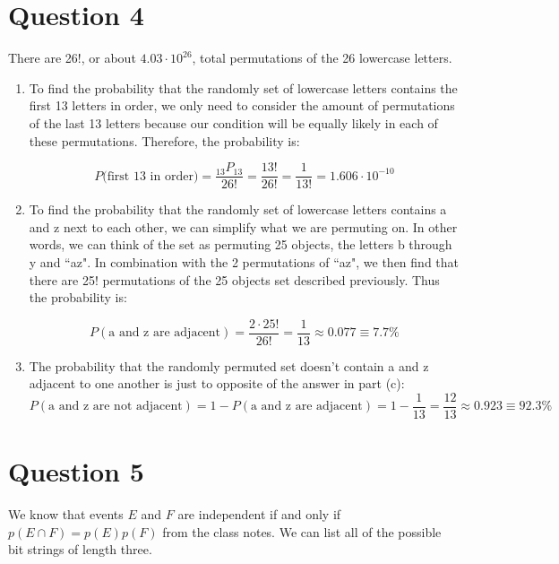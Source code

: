 \documentclass[11pt]{article}
\begin{document}
\section*{Question 4}
There are 26!, or about $4.03 \cdot 10^{26}$, total permutations of the 26 lowercase letters.

\begin{enumerate}
    \item To find the probability that the randomly set of lowercase letters contains the first 13 letters in order, we only need to consider the amount of permutations of the last 13 letters because our condition will be equally likely in each of these permutations. Therefore, the probability is:
    
    \[P(\text{first 13 in order)} = \frac{_{13}P_{13}}{26!} = \frac{13!}{26!} = \frac{1}{13!} = 1.606 \cdot 10^{-10}\]
    
    \item To find the probability that the randomly set of lowercase letters contains a and z next to each other, we can simplify what we are permuting on. In other words, we can think of the set as permuting 25 objects, the letters b through y and ``az". In combination with the 2 permutations of ``az", we then find that there are 25! permutations of the 25 objects set described previously. Thus the probability is:
    
    \[P(\text{a and z are adjacent}) = \frac{2 \cdot 25!}{26!} = \frac{1}{13} \approx 0.077 \equiv 7.7\%\]
    
    \item The probability that the randomly permuted set doesn't contain a and z adjacent to one another is just to opposite of the answer in part (c):
    \[P(\text{a and z are not adjacent}) = 1 - P(\text{a and z are adjacent}) = 1 - \frac{1}{13} = \frac{12}{13} \approx 0.923 \equiv 92.3\%\]
\end{enumerate}

\section*{Question 5}
We know that events $E$ and $F$ are independent if and only if $p(E \cap F) = p(E)p(F)$ from the class notes. We can list all of the possible bit strings of length three.
\end{document}
